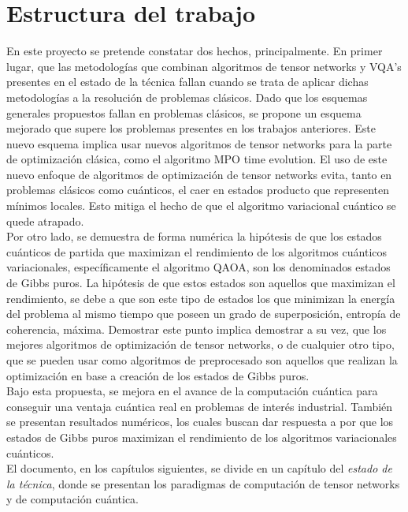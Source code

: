 \newpage

\section{Estructura del trabajo}

En este proyecto se pretende constatar dos hechos, principalmente. En primer lugar, que las metodologías que combinan algoritmos de tensor networks y VQA's presentes en el estado de la técnica fallan cuando se trata de aplicar dichas metodologías a la resolución de problemas clásicos. Dado que los esquemas generales propuestos fallan en problemas clásicos, se propone un esquema mejorado que supere los problemas presentes en los trabajos anteriores. Este nuevo esquema implica usar nuevos algoritmos de tensor networks para la parte de optimización clásica, como el algoritmo MPO time evolution. El uso de este nuevo enfoque de algoritmos de optimización de tensor networks evita, tanto en problemas clásicos como cuánticos, el caer en estados producto que representen mínimos locales. Esto mitiga el hecho de que el algoritmo variacional cuántico se quede atrapado. \\

Por otro lado, se demuestra de forma numérica la hipótesis de que los estados cuánticos de partida que maximizan el rendimiento de los algoritmos cuánticos variacionales, específicamente el algoritmo QAOA, son los denominados estados de Gibbs puros. La hipótesis de que estos estados son aquellos que maximizan el rendimiento, se debe a que son este tipo de estados los que minimizan la energía del problema al mismo tiempo que poseen un grado de superposición, entropía de coherencia, máxima. Demostrar este punto implica demostrar a su vez, que los mejores algoritmos de optimización de tensor networks, o de cualquier otro tipo, que se pueden usar como algoritmos de preprocesado son aquellos que realizan la optimización en base a creación de los estados de Gibbs puros. \\

Bajo esta propuesta, se mejora en el avance de la computación cuántica para conseguir una ventaja cuántica real en problemas de interés industrial. También se presentan resultados numéricos, los cuales buscan dar respuesta a por que los estados de Gibbs puros maximizan el rendimiento de los algoritmos variacionales cuánticos. \\

El documento, en los capítulos siguientes, se divide en un capítulo del \textit{estado de la técnica}, donde se presentan los paradigmas de computación de tensor networks y de computación cuántica. 

